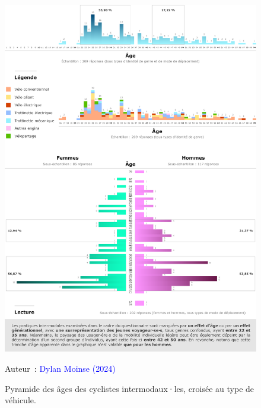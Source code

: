 \begin{refsegment}
    \begin{figure}[h!]\vspace*{4pt}
        \caption{Pyramide des âges des cyclistes intermodaux·les, croisée au type de véhicule.}
        \label{fig-chap4:pyramide-age}
        \centerline{\includegraphics[width=1\columnwidth]{src/Figures/Chap-4/FR_Pyramide_age.pdf}}
        \vspace{5pt}
        \begin{flushright}\scriptsize{
        Auteur~: \textcolor{blue}{Dylan Moinse (2024)}
        }\end{flushright}
    \end{figure}


\end{refsegment}
